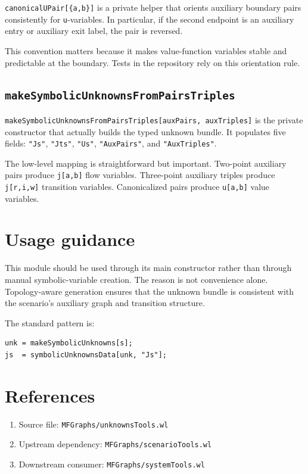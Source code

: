 \documentclass[11pt]{article}
\begin{document}
\texttt{canonicalUPair[\{a,b\}]} is a private helper that orients auxiliary boundary pairs consistently for \texttt{u}-variables. In particular, if the second endpoint is an auxiliary entry or auxiliary exit label, the pair is reversed.

This convention matters because it makes value-function variables stable and predictable at the boundary. Tests in the repository rely on this orientation rule.

\subsection*{\texttt{makeSymbolicUnknownsFromPairsTriples}}

\texttt{makeSymbolicUnknownsFromPairsTriples[auxPairs, auxTriples]} is the private constructor that actually builds the typed unknown bundle. It populates five fields: \texttt{"Js"}, \texttt{"Jts"}, \texttt{"Us"}, \texttt{"AuxPairs"}, and \texttt{"AuxTriples"}.

The low-level mapping is straightforward but important. Two-point auxiliary pairs produce \texttt{j[a,b]} flow variables. Three-point auxiliary triples produce \texttt{j[r,i,w]} transition variables. Canonicalized pairs produce \texttt{u[a,b]} value variables.

\section{Usage guidance}

This module should be used through its main constructor rather than through manual symbolic-variable creation. The reason is not convenience alone. Topology-aware generation ensures that the unknown bundle is consistent with the scenario's auxiliary graph and transition structure.

The standard pattern is:

\begin{verbatim}
unk = makeSymbolicUnknowns[s];
js  = symbolicUnknownsData[unk, "Js"];
\end{verbatim}

\section*{References}

\begin{enumerate}
\item Source file: \texttt{MFGraphs/unknownsTools.wl}
\item Upstream dependency: \texttt{MFGraphs/scenarioTools.wl}
\item Downstream consumer: \texttt{MFGraphs/systemTools.wl}
\end{enumerate}
\end{document}
